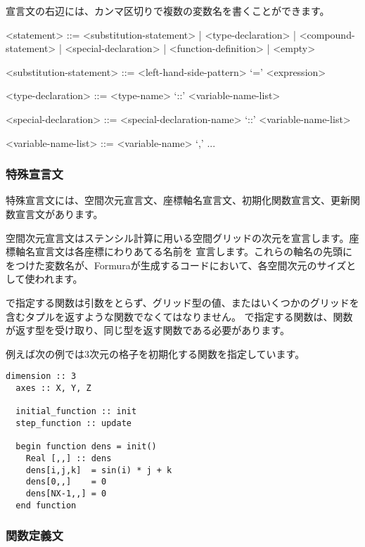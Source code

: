 \documentclass{jsarticle}
\begin{document}
宣言文の右辺には、カンマ区切りで複数の変数名を書くことができます。

\begin{grammar}
  <statement> ::= <substitution-statement> |
  <type-declaration> |
  <compound-statement> |
  <special-declaration> |
  <function-definition> |
 <empty>

 <substitution-statement> ::= <left-hand-side-pattern> `=' <expression>

 <type-declaration> ::= <type-name> `::' <variable-name-list>

 <special-declaration> ::= <special-declaration-name> `::' <variable-name-list>

 <variable-name-list> ::= <variable-name> `,' ...
\end{grammar}

\subsubsection{特殊宣言文}

特殊宣言文には、空間次元宣言文、座標軸名宣言文、初期化関数宣言文、更新関数宣言文があります。

空間次元宣言文はステンシル計算に用いる空間グリッドの次元を宣言します。座標軸名宣言文は各座標にわりあてる名前を
宣言します。これらの軸名の先頭にをつけた変数名が、Formuraが生成するコードにおいて、各空間次元のサイズとして使われます。

で指定する関数は引数をとらず、グリッド型の値、またはいくつかのグリッドを含むタプルを返すような関数でなくてはなりません。
で指定する関数は、関数が返す型を受け取り、同じ型を返す関数である必要があります。


例えば次の例では3次元の格子を初期化する関数を指定しています。

\begin{lstlisting}[mathescape]
  dimension :: 3
  axes :: X, Y, Z

  initial_function :: init
  step_function :: update

  begin function dens = init()
    Real [,,] :: dens
    dens[i,j,k]  = sin(i) * j + k
    dens[0,,]    = 0
    dens[NX-1,,] = 0
  end function
\end{lstlisting}





\subsubsection{関数定義文}
\end{document}
